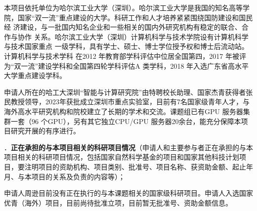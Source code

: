 \documentclass[12pt,UTF8,AutoFakeBold=2,a4paper]{ctexart} %
\newcommand{\sihao}{\fontsize{14pt}{\baselineskip}\selectfont}
\begin{document}
本项目依托单位为哈尔滨工业大学（深圳）。哈尔滨工业大学是我国的知名高等学
院，国家“双一流”重点建设的大学。科研工作和人才培养紧紧围绕国防建设和国民经
济建设，与一批国内知名企业和一些相关的国内外研究机构有稳定的联合、合作与协作
关系。哈尔滨工业大学（深圳）计算机科学与技术学院设有计算机科学与技术国家重点
一级学科，具有学士、硕士、博士学位授予权和博士后流动站。计算机科学与技术学科
在2012 年教育部学科评估中位居全国第四，2017 年被评为“双一流”建设学科和全国第四轮学科评估A 类学科，2018 年入选广东省高水平大学重点建设学科。

申请人所在的哈工大深圳“智能与计算研究院”由特聘校长助理、国家杰青获得者张民教授领导，2023年获批成立深圳市重点实验室，目前有7名国家级青年人才，与海外高水平研究机构和院校建立了长期的学术和交流。课题组已有GPU 服务器集群一套（96 个GPU），另有其它独立CPU/GPU 服务器20余台，能充分保障本项目研究开展的有序进行。

{\sihao \color{MsBlue} ．{\bfseries 正在承担的与本项目相关的科研项目情况}（申请人和主要参与者正在承担的与本项目相关的科研项目情况，包括国家自然科学基金的项目和国家其他科技计划项目，要注明项目的资助机构、项目类别、批准号、项目名称、获资助金额、起止年月、与本项目的关系及负责的内容等）；}

申请人周逊目前没有正在执行的与本课题相关的国家级科研项目。申请人入选国家优青（海外）项目，目前尚待批准立项，目前暂无批准号、资助金额信息。
\end{document}
